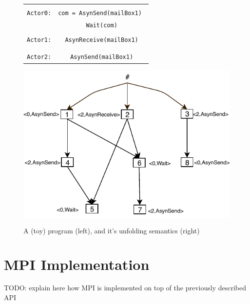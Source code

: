 \documentclass[a4paper,11pt]{article}
\newcommand{\code}[1]{\texttt{#1}}
\begin{document}
\begin{figure}[H]
\label{fig:unfoldSematics}

\begin{multicols}{2}



\centering
\begin{tabular}{c c}
	\\\\
\code{Actor0:}&\code{com = AsynSend(mailBox1) }\\&\code{Wait(com)} \\\\
\code{Actor1:}&\code{AsynReceive(mailBox1)} \\\\\\
\code{Actor2:}&\code{AsynSend(mailBox1)} \\
\end{tabular}
\label{table:ta}
\includegraphics[width=\linewidth]{unfolding.pdf}

\end{multicols}
\caption{A (toy) program (left), and it's unfolding  semantics (right)}

\end{figure}


\section{MPI Implementation}\label{sec:mpi}
TODO: explain here how MPI is implemented on top of the previously described API
\newpage
\nocite{*}	  	


\end{document}
